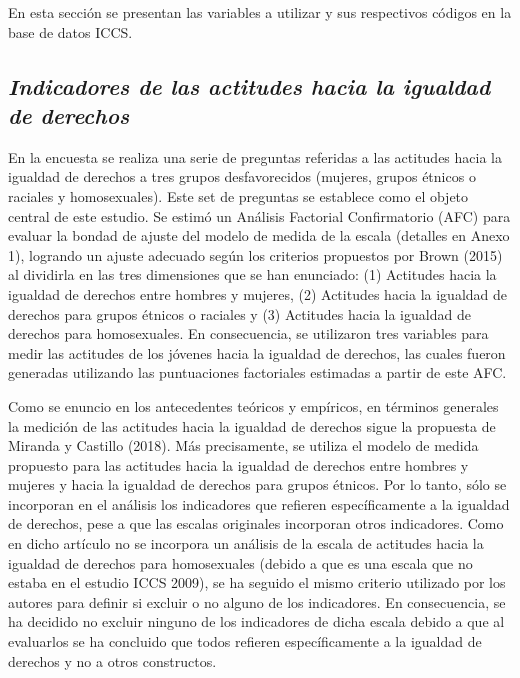 \documentclass[12pt,twoside]{templates/facsothesis}
\begin{document}
En esta sección se presentan las variables a utilizar y sus respectivos códigos en la base de datos ICCS.

\hypertarget{indicadores-de-las-actitudes-hacia-la-igualdad-de-derechos}{%
\subsection{\texorpdfstring{\emph{Indicadores de las actitudes hacia la igualdad de derechos}}{Indicadores de las actitudes hacia la igualdad de derechos}}\label{indicadores-de-las-actitudes-hacia-la-igualdad-de-derechos}}

En la encuesta se realiza una serie de preguntas referidas a las actitudes hacia la igualdad de derechos a tres grupos desfavorecidos (mujeres, grupos étnicos o raciales y homosexuales). Este set de preguntas se establece como el objeto central de este estudio. Se estimó un Análisis Factorial Confirmatorio (AFC) para evaluar la bondad de ajuste del modelo de medida de la escala (detalles en Anexo 1), logrando un ajuste adecuado según los criterios propuestos por Brown (2015) al dividirla en las tres dimensiones que se han enunciado: (1) Actitudes hacia la igualdad de derechos entre hombres y mujeres, (2) Actitudes hacia la igualdad de derechos para grupos étnicos o raciales y (3) Actitudes hacia la igualdad de derechos para homosexuales. En consecuencia, se utilizaron tres variables para medir las actitudes de los jóvenes hacia la igualdad de derechos, las cuales fueron generadas utilizando las puntuaciones factoriales estimadas a partir de este AFC.

Como se enuncio en los antecedentes teóricos y empíricos, en términos generales la medición de las actitudes hacia la igualdad de derechos sigue la propuesta de Miranda y Castillo (2018). Más precisamente, se utiliza el modelo de medida propuesto para las actitudes hacia la igualdad de derechos entre hombres y mujeres y hacia la igualdad de derechos para grupos étnicos. Por lo tanto, sólo se incorporan en el análisis los indicadores que refieren específicamente a la igualdad de derechos, pese a que las escalas originales incorporan otros indicadores. Como en dicho artículo no se incorpora un análisis de la escala de actitudes hacia la igualdad de derechos para homosexuales (debido a que es una escala que no estaba en el estudio ICCS 2009), se ha seguido el mismo criterio utilizado por los autores para definir si excluir o no alguno de los indicadores. En consecuencia, se ha decidido no excluir ninguno de los indicadores de dicha escala debido a que al evaluarlos se ha concluido que todos refieren específicamente a la igualdad de derechos y no a otros constructos.
\end{document}
